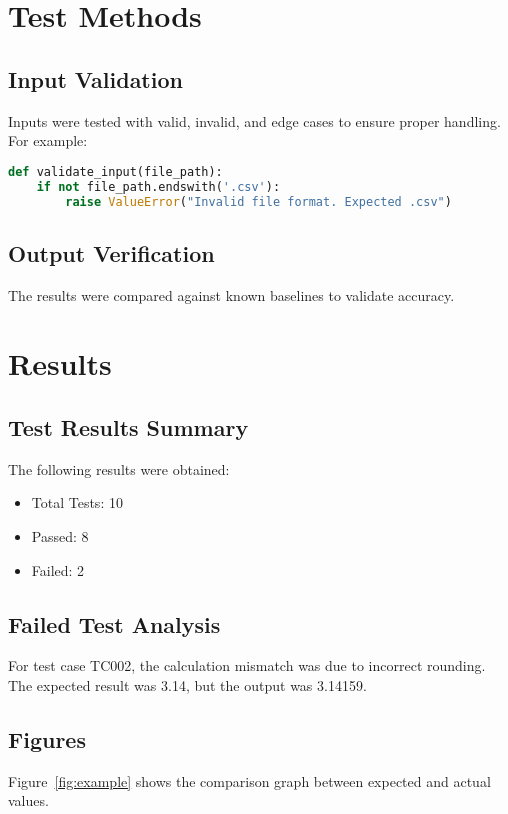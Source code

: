 \documentclass[a4paper,12pt]{article}
\begin{document}
\section{Test Methods}
\subsection{Input Validation}
Inputs were tested with valid, invalid, and edge cases to ensure proper handling. For example:

\begin{lstlisting}[language=Python, caption=Input Validation Code]
def validate_input(file_path):
    if not file_path.endswith('.csv'):
        raise ValueError("Invalid file format. Expected .csv")
\end{lstlisting}

\subsection{Output Verification}
The results were compared against known baselines to validate accuracy.

\section{Results}
\subsection{Test Results Summary}
The following results were obtained:
\begin{itemize}
    \item Total Tests: 10
    \item Passed: 8
    \item Failed: 2
\end{itemize}

\subsection{Failed Test Analysis}
For test case TC002, the calculation mismatch was due to incorrect rounding. The expected result was 3.14, but the output was 3.14159.

\subsection{Figures}
Figure~\ref{fig:example} shows the comparison graph between expected and actual values.
\end{document}
